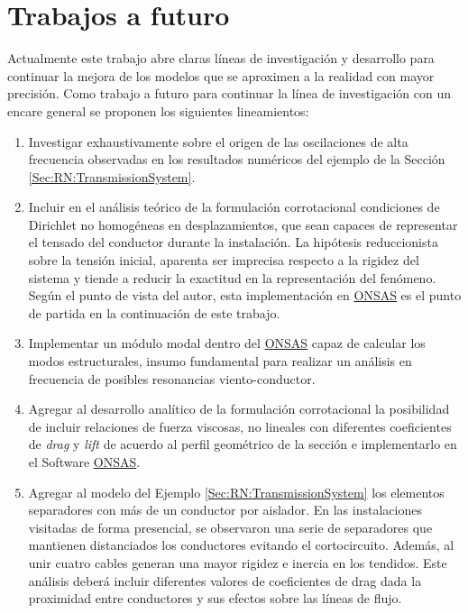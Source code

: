 \section{Trabajos a futuro}

Actualmente este trabajo abre claras líneas de investigación y desarrollo para continuar la mejora de los modelos que se aproximen a la realidad con mayor precisión. Como trabajo a futuro para continuar la línea de investigación con un encare general se proponen los siguientes lineamientos:

\begin{enumerate}
	\item Investigar exhaustivamente sobre el origen de las oscilaciones de alta frecuencia observadas en los resultados numéricos del ejemplo de la Sección \ref{Sec:RN:TransmissionSystem}.
	\item Incluir en el análisis teórico de la formulación corrotacional condiciones de Dirichlet no homogéneas en desplazamientos, que sean capaces de representar el tensado del conductor durante la instalación. La hipótesis reduccionista sobre la tensión inicial, aparenta ser imprecisa respecto a la rigidez del sistema y tiende a reducir la exactitud en la representación del fenómeno. Según el punto de vista del autor, esta implementación en \href{https://github.com/ONSAS/ONSAS.m/}{ONSAS} es el punto de partida en la continuación de este trabajo. 
	\item Implementar un módulo modal dentro del \href{https://github.com/ONSAS/ONSAS.m/}{ONSAS} capaz de calcular los modos estructurales, insumo fundamental para realizar un análisis en frecuencia de posibles resonancias viento-conductor.
	\item Agregar al desarrollo analítico de la formulación corrotacional la posibilidad de incluir relaciones de fuerza viscosas, no lineales con diferentes coeficientes de \textit{drag} y \textit{lift} de acuerdo al perfil geométrico de la sección e implementarlo en el Software \href{https://github.com/ONSAS/ONSAS.m/}{ONSAS}.
	\item Agregar al modelo del Ejemplo \ref{Sec:RN:TransmissionSystem} los elementos separadores con más de un conductor por aislador. En las instalaciones visitadas de forma presencial, se observaron una serie de separadores que mantienen distanciados los conductores evitando el cortocircuito. Además, al unir cuatro cables generan una mayor rigidez e inercia en los tendidos. Este análisis deberá incluir diferentes valores de coeficientes de drag dada la proximidad entre conductores y sus efectos sobre las líneas de flujo.  

\end{enumerate}
